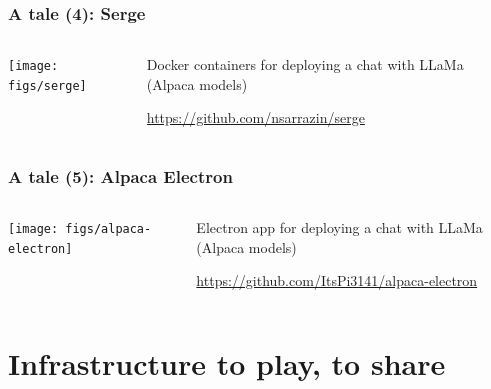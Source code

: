 \documentclass[17pt,aspectratio=169,hyperref={pdfusetitle,colorlinks,allcolors=olive}]{beamer}
\begin{document}
\begin{frame}[fragile]
  \frametitle{A tale (4): Serge}

  \begin{columns}[T]
    \begin{column}{.58\textwidth}
      \texttt{[image: figs/serge]}
    \end{column}%
    \hfill%
    \begin{column}{.38\textwidth}
      \vspace{1.5cm}

      Docker containers for deploying a chat with LLaMa (Alpaca models)
      
    {\scriptsize
      \url{https://github.com/nsarrazin/serge}
    }
    \end{column}%
  \end{columns}

\end{frame}

\begin{frame}[fragile]
  \frametitle{A tale (5): Alpaca Electron}

  \begin{columns}[T]
    \begin{column}{.58\textwidth}
      \texttt{[image: figs/alpaca-electron]}
    \end{column}%
    \hfill%
    \begin{column}{.38\textwidth}
      \vspace{1.5cm}

      Electron app for deploying a chat with LLaMa (Alpaca models)
      
    {\scriptsize
      \url{https://github.com/ItsPi3141/alpaca-electron}
    }
    \end{column}%
  \end{columns}

\end{frame}

\section{Infrastructure to play, to share}
\end{document}
